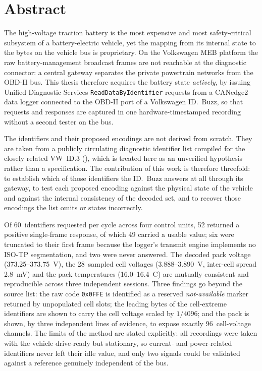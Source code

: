 \documentclass[11pt,a4paper,oneside,parskip=half]{scrreprt}
\begin{document}
\chapter*{Abstract}
\thispagestyle{plain}

The high-voltage traction battery is the most expensive and most safety-critical subsystem of a
battery-electric vehicle, yet the mapping from its internal state to the bytes on the vehicle bus is
proprietary. On the Volkswagen MEB platform the raw battery-management broadcast frames are not
reachable at the diagnostic connector: a central gateway separates the private powertrain networks
from the OBD-II bus. This thesis therefore acquires the battery state \emph{actively}, by issuing
Unified Diagnostic Services \texttt{ReadDataByIdentifier} requests from a CANedge2 data logger
connected to the OBD-II port of a Volkswagen ID.~Buzz, so that requests and responses are captured in
one hardware-timestamped recording without a second tester on the bus.

The identifiers and their proposed encodings are not derived from scratch. They are taken from a
publicly circulating diagnostic identifier list compiled for the closely related VW~ID.3
(\cite{vwmebpidlist}), which is treated here as an unverified hypothesis rather than a specification.
The contribution of this work is therefore threefold: to establish which of those identifiers the
ID.~Buzz answers at all through its gateway, to test each proposed encoding against the physical
state of the vehicle and against the internal consistency of the decoded set, and to recover those
encodings the list omits or states incorrectly.

Of 60~identifiers requested per cycle across four control units, 52 returned a positive single-frame
response, of which 49 carried a usable value; six were truncated to their first frame because the
logger's transmit engine implements no ISO-TP segmentation, and two were never answered. The decoded
pack voltage (373.25--373.75~V), the 28~sampled cell voltages (3.888--3.890~V, inter-cell spread
2.8~mV) and the pack temperatures (16.0--16.4~\textdegree C) are mutually consistent and reproducible
across three independent sessions. Three findings go beyond the source list: the raw code
\texttt{0x0FFE} is identified as a reserved \emph{not-available} marker returned by unpopulated cell
slots; the leading bytes of the cell-extreme identifiers are shown to carry the cell voltage scaled by
$1/4096$; and the pack is shown, by three independent lines of evidence, to expose exactly
96~cell-voltage channels. The limits of the method are stated explicitly: all recordings were taken
with the vehicle drive-ready but stationary, so current- and power-related identifiers never left
their idle value, and only two signals could be validated against a reference genuinely independent of
the bus.
\end{document}
